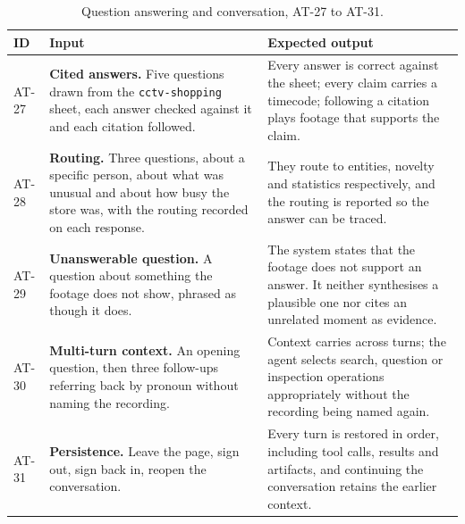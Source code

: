 \documentclass[11pt,a4paper]{article}
\begin{document}
\begin{table}[htbp]
\centering
\scriptsize
\begin{tabularx}{\textwidth}{@{}L{0.85cm}XX@{}}
\toprule
\textbf{ID} & \textbf{Input} & \textbf{Expected output} \\
\midrule
AT-27 & \textbf{Cited answers.} Five questions drawn from the \texttt{cctv-shopping} sheet,
each answer checked against it and each citation followed. &
Every answer is correct against the sheet; every claim carries a timecode; following a
citation plays footage that supports the claim. \\
AT-28 & \textbf{Routing.} Three questions, about a specific person, about what was unusual
and about how busy the store was, with the routing recorded on each response. &
They route to entities, novelty and statistics respectively, and the routing is reported so
the answer can be traced. \\
AT-29 & \textbf{Unanswerable question.} A question about something the footage does not
show, phrased as though it does. &
The system states that the footage does not support an answer. It neither synthesises a
plausible one nor cites an unrelated moment as evidence. \\
AT-30 & \textbf{Multi-turn context.} An opening question, then three follow-ups referring
back by pronoun without naming the recording. &
Context carries across turns; the agent selects search, question or inspection operations
appropriately without the recording being named again. \\
AT-31 & \textbf{Persistence.} Leave the page, sign out, sign back in, reopen the
conversation. &
Every turn is restored in order, including tool calls, results and artifacts, and
continuing the conversation retains the earlier context. \\
\bottomrule
\end{tabularx}
\caption{Question answering and conversation, AT-27 to AT-31.}
\end{table}
\end{document}
